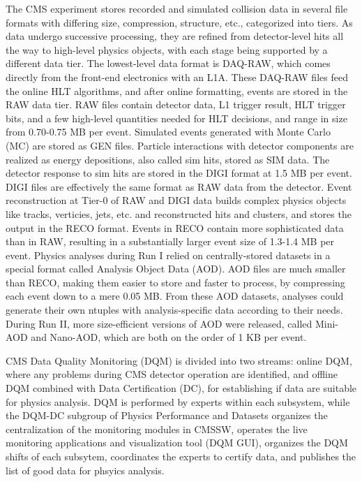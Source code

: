The CMS experiment stores recorded and simulated collision data in several file formats with differing size, compression, structure, etc., categorized into tiers. As data undergo successive processing, they are refined from detector-level hits all the way to high-level physics objects, with each stage being supported by a different data tier. The lowest-level data format is DAQ-RAW, which comes directly from the front-end electronics with an L1A. These DAQ-RAW files feed the online HLT algorithms, and after online formatting, events are stored in the RAW data tier. RAW files contain detector data, L1 trigger result, HLT trigger bits, and a few high-level quantities needed for HLT decisions, and range in size from 0.70-0.75 MB per event. Simulated events generated with Monte Carlo (MC) are stored as GEN files. Particle interactions with detector components are realized as energy depositions, also called sim hits, stored as SIM data. The detector response to sim hits are stored in the DIGI format at 1.5 MB per event. DIGI files are effectively the same format as RAW data from the detector. Event reconstruction at Tier-0 of RAW and DIGI data builds complex physics objects like tracks, verticies, jets, etc. and reconstructed hits and clusters, and stores the output in the RECO format. Events in RECO contain more sophisticated data than in RAW, resulting in a substantially larger event size of 1.3-1.4 MB per event. Physics analyses during Run I relied on centrally-stored datasets in a special format called Analysis Object Data (AOD). AOD files are much smaller than RECO, making them easier to store and faster to process, by compressing each event down to a mere 0.05 MB. From these AOD datasets, analyses could generate their own ntuples with analysis-specific data according to their needs. During Run II, more size-efficient versions of AOD were released, called Mini-AOD and Nano-AOD, which are both on the order of 1 KB per event.

CMS Data Quality Monitoring (DQM) is divided into two streams: online DQM, where any problems during CMS detector operation are identified, and offline DQM combined with Data Certification (DC), for establishing if data are suitable for physics analysis. DQM is performed by experts within each subsystem, while the DQM-DC subgroup of Physics Performance and Datasets organizes the centralization of the monitoring modules in CMSSW, operates the live monitoring applications and visualization tool (DQM GUI), organizes the DQM shifts of each subsytem, coordinates the experts to certify data, and publishes the list of good data for phsyics analysis.

